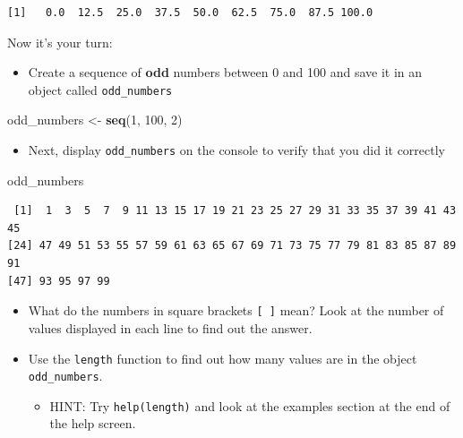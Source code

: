 \documentclass[]{article}
\newenvironment{Shaded}{\begin{snugshade}}{\end{snugshade}}
\newcommand{\KeywordTok}[1]{\textcolor[rgb]{0.13,0.29,0.53}{\textbf{#1}}}
\newcommand{\DecValTok}[1]{\textcolor[rgb]{0.00,0.00,0.81}{#1}}
\newcommand{\StringTok}[1]{\textcolor[rgb]{0.31,0.60,0.02}{#1}}
\newcommand{\NormalTok}[1]{#1}
\providecommand{\tightlist}{%
  \setlength{\itemsep}{0pt}\setlength{\parskip}{0pt}}
\theoremstyle{definition}
\theoremstyle{definition}
\theoremstyle{definition}
\theoremstyle{remark}
\begin{document}
\begin{verbatim}
[1]   0.0  12.5  25.0  37.5  50.0  62.5  75.0  87.5 100.0
\end{verbatim}

Now it's your turn:

\begin{itemize}
\tightlist
\item
  Create a sequence of \textbf{odd} numbers between 0 and 100 and save
  it in an object called \texttt{odd\_numbers}
\end{itemize}

\begin{Shaded}
\begin{Highlighting}[]
\NormalTok{odd_numbers <-}\StringTok{ }\KeywordTok{seq}\NormalTok{(}\DecValTok{1}\NormalTok{, }\DecValTok{100}\NormalTok{, }\DecValTok{2}\NormalTok{)}
\end{Highlighting}
\end{Shaded}

\begin{itemize}
\tightlist
\item
  Next, display \texttt{odd\_numbers} on the console to verify that you
  did it correctly
\end{itemize}

\begin{Shaded}
\begin{Highlighting}[]
\NormalTok{odd_numbers}
\end{Highlighting}
\end{Shaded}

\begin{verbatim}
 [1]  1  3  5  7  9 11 13 15 17 19 21 23 25 27 29 31 33 35 37 39 41 43 45
[24] 47 49 51 53 55 57 59 61 63 65 67 69 71 73 75 77 79 81 83 85 87 89 91
[47] 93 95 97 99
\end{verbatim}

\begin{itemize}
\item
  What do the numbers in square brackets \texttt{{[}\ {]}} mean? Look at
  the number of values displayed in each line to find out the answer.
\item
  Use the \texttt{length} function to find out how many values are in
  the object \texttt{odd\_numbers}.

  \begin{itemize}
  \tightlist
  \item
    HINT: Try \texttt{help(length)} and look at the examples section at
    the end of the help screen.
  \end{itemize}
\end{itemize}
\end{document}
